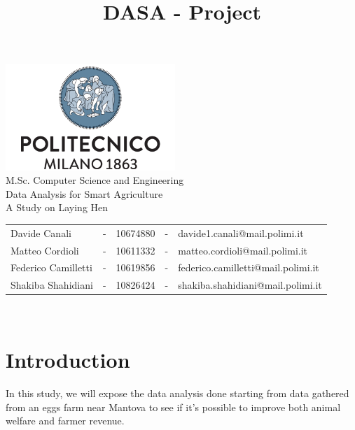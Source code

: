\documentclass[11pt]{article}
\title{DASA - Project}
\begin{document}
\setlength{\parskip}{1em}

\begin{titlepage}
    \centering
    \vfill
    {
        \includegraphics[width =\linewidth, height = 4cm, keepaspectratio]{PolitecnicoLogo.png}
        \label{fig:PolitecnicoLogo}
        \large \\[2ex]M.Sc. Computer Science and Engineering\\
        \large Data Analysis for Smart Agriculture\\[12ex]
        \huge
        A Study on Laying Hen\\[1.5ex]
        \large
        \vspace{10mm}

        \vspace{15mm}
        \normalsize

        \vspace{30mm}

        \begin{tabular}{lclcl}
            Davide Canali       & - & 10674880 & - & davide1.canali@mail.polimi.it      \\
            Matteo Cordioli     & - & 10611332 & - & matteo.cordioli@mail.polimi.it     \\
            Federico Camilletti & - & 10619856 & - & federico.camilletti@mail.polimi.it \\
            Shakiba Shahidiani  & - & 10826424 & - & shakiba.shahidiani@mail.polimi.it  \\
        \end{tabular}

        \vspace{30mm}

        \@date\\[2.5ex]
    }
\end{titlepage}

\makeatother
\tableofcontents
\newpage

\section{Introduction}
In this study, we will expose the data analysis done starting from data gathered from an eggs farm near Mantova to see if it's possible to improve both animal welfare and farmer revenue.
\end{document}
